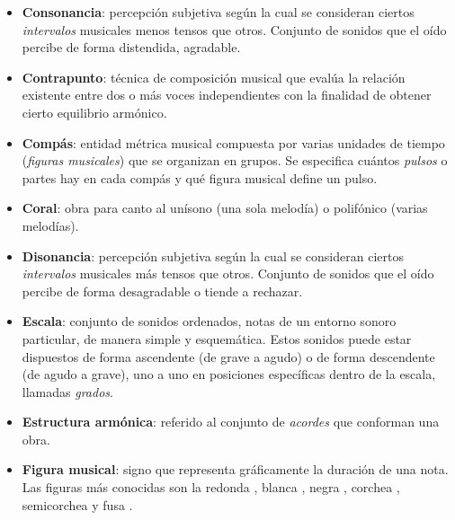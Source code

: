 \begin{itemize}[label={}, leftmargin=*]
	\bigskip

	\label{consonancia}
	\item \textbf{Consonancia}: percepción subjetiva según la cual se consideran ciertos \textit{intervalos} musicales menos tensos que otros. Conjunto de sonidos que el oído percibe de forma distendida, agradable.

	\bigskip

	\label{contrapunto}
	\item \textbf{Contrapunto}: técnica de composición musical que evalúa la relación existente entre dos o más voces independientes  con la finalidad de obtener cierto equilibrio armónico.

	\bigskip

	\label{compás}
	\item \textbf{Compás}: entidad métrica musical compuesta por varias unidades de tiempo (\textit{figuras musicales}) que se organizan en grupos. Se especifica cuántos \textit{pulsos} o partes hay en cada compás y qué figura musical define un pulso.

	\bigskip

	\label{coral}
	\item \textbf{Coral}: obra para canto al unísono (una sola melodía) o polifónico (varias melodías).

	\bigskip

	\label{disonancia}
	\item \textbf{Disonancia}: percepción subjetiva según la cual se consideran ciertos \textit{intervalos} musicales más tensos que otros. Conjunto de sonidos que el oído percibe de forma desagradable o tiende a rechazar.

	\bigskip

	\label{escala}
	\item \textbf{Escala}: conjunto de sonidos ordenados, notas de un entorno sonoro particular, de manera simple y esquemática. Estos sonidos puede estar dispuestos de forma ascendente (de grave a agudo) o de forma descendente (de agudo a grave), uno a uno en posiciones específicas dentro de la escala, llamadas \textit{grados}.

	\bigskip

	\label{estructura}
	\item \textbf{Estructura armónica}: referido al conjunto de \textit{acordes} que conforman una obra. 

	\bigskip

	\label{figura}
	\item \textbf{Figura musical}: signo que representa gráficamente la duración de una nota. Las figuras más conocidas son la redonda \wholeNote{}, blanca \halfNote{}, negra \quarterNote{}, corchea \eighthNote{}, semicorchea \sixteenthNote{} y fusa \thirtysecondNote{}.


\end{itemize}
